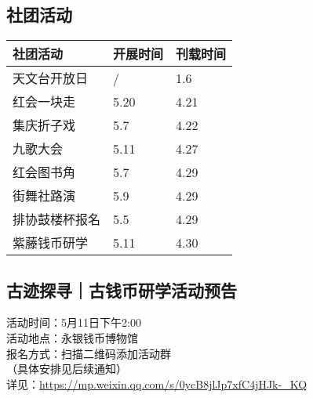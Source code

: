 \documentclass[letterpaper, 12pt]{article}
\begin{document}
\begin{multicols}{2}
\section{社团活动}
\begin{tabular}{|>{\centering\arraybackslash}m{}|m{}|m{}|}
    \hline
    社团活动 & 开展时间 & 刊载时间\\
    \hline\hline
    天文台开放日 & / & 1.6\\
    红会一块走 & 5.20 & 4.21\\
    集庆折子戏 & 5.7 & 4.22\\
    九歌大会 & 5.11 & 4.27\\
    红会图书角 & 5.7 & 4.29\\
    街舞社路演 & 5.9 & 4.29\\
    排协鼓楼杯报名 & 5.5 & 4.29\\
    紫藤钱币研学 & 5.11 & 4.30\\
    \hline
\end{tabular}

\subsection{古迹探寻｜古钱币研学活动预告} %
活动时间：5月11日下午2:00
\\活动地点：永银钱币博物馆
\\报名方式：扫描二维码添加活动群
\\（具体安排见后续通知）
\\详见：\url{https://mp.weixin.qq.com/s/0ycB8jlJp7xfC4jHJk-_KQ}
\end{multicols}
\end{document}
